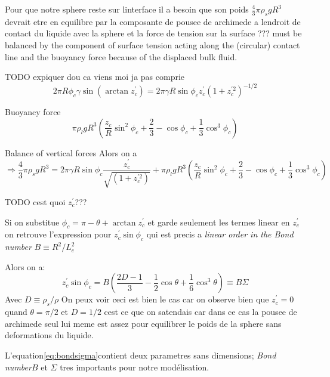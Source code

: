     Pour que notre sphere reste sur linterface il a besoin que son poids \(\frac{4}{3}\pi\rho_{s}gR^3\) devrait etre en equilibre par la composante de pousee de archimede a lendroit de contact du liquide avec la sphere et la force de tension sur la surface ??? must be balanced by the component of surface tension acting along the (circular) contact line and the buoyancy force because of the displaced bulk fluid.

    TODO expiquer dou ca viens moi ja pas comprie
    \begin{equation}
        2\pi R \phi_c \gamma \sin(\arctan z_c^{'}) = 2\pi\gamma R \sin\phi_c z_c^{'}(1+z_c^{'2})^{-1/2}
        \label{eq:wut}
    \end{equation}

    Buoyancy force
    \begin{equation}
        \pi\rho_l g R^3 (\frac{z_c}{R}\sin^2 \phi_c + \frac{2}{3}-\cos\phi_c+\frac{1}{3}\cos^3 \phi_c)
        \label{eq:buoyancyForce}
    \end{equation}

    Balance of vertical forces
    Alors on a
    \begin{equation}
        \Rightarrow \frac{4}{3}\pi\rho_{s}gR^3 =2\pi\gamma R \sin\phi_c \frac{z_c^{'}}{\sqrt{(1+z_c^{'2})}} + \pi\rho_l g R^3 (\frac{z_c}{R}\sin^2 \phi_c + \frac{2}{3}-\cos\phi_c+\frac{1}{3}\cos^3 \phi_c)
    \end{equation}

    TODO cest quoi $z_c^{'}$???

    Si on substitue \(\phi_c = \pi - \theta + \arctan z_c^{'}\) et garde seulement les termes linear en \(z_c^{'}\) on retrouve l'expression pour \(z_c^{'}\sin \phi_c\) qui est precis a \textit{linear order in the Bond number} \(B \equiv R^2/L_c^2\) 

    Alors on a:
    \begin{equation}
        z_c^{'}\sin \phi_c = B(\frac{2D-1}{3}-\frac{1}{2}\cos \theta + \frac{1}{6} \cos^3 \theta) \equiv B\Sigma
        \label{eq:bondsigma}
    \end{equation}
    Avec \(D \equiv \rho_s / \rho\) On peux voir ceci est bien le cas car on observe bien que \(z_c^{'} = 0\) quand \(\theta = \pi/2\) et \(D = 1/2\) cest ce que on satendais car dans ce cas la pousee de archimede seul lui meme est assez pour equilibrer le poids de la sphere sans deformations du liquide.

    L'equation\ref{eq:bondsigma}contient deux parametres sans dimensions; \textit{Bond number}$B$ et $\Sigma$ tres importants pour notre modélisation.

